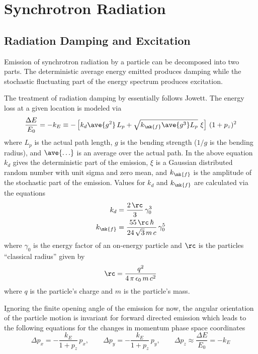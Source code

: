 \chapter{Synchrotron Radiation}

\section{Radiation Damping and Excitation}
\label{s:radiation}

Emission of synchrotron radiation by a particle can be decomposed into two parts. The deterministic
average energy emitted produces damping while the stochastic fluctuating part of the energy spectrum
produces excitation\cite{b:jowett}.

The treatment of radiation damping by \bmad essentially follows Jowett\cite{b:jowett}. The energy
loss at a given location is modeled via
\begin{equation}
  \frac{\Delta E}{E_0} = 
  -k_E \equiv -\left[ k_d \ave{g^2} \, L_p + \sqrt{k_\mk{f} \ave{g^3} L_p} \,\, \xi \right] \, (1 + p_z)^2
  \label{deekk}
\end{equation}
where $L_p$ is the actual path length, $g$ is the bending strength ($1/g$ is the bending radius),
and $\ave{\ldots}$ is an average over the actual path.  In the above equation $k_d$ gives the
deterministic part of the emission, $\xi$ is a Gaussian distributed random number with unit sigma
and zero mean, and $k_\mk{f}$ is the amplitude of the stochastic part of the emission. Values for $k_d$
and $k_\mk{f}$ are calculated via the equations
\begin{align}
  k_d &= \frac{2 \, \rc}{3} \, \gamma_0^3
    \label{k2r3g} \\
  k_\mk{f} &= \frac{55 \, \rc \, \hbar}{24 \, \sqrt{3} \, m \, c} \, \gamma_0^5
    \label{k55rh}
\end{align}
where $\gamma_0$ is the energy factor of an on-energy particle and $\rc$ is the particles
``classical radius'' given by
\begin{equation}
  \rc = \frac{q^2}{4 \, \pi \, \epsilon_0 \, m \, c^2} 
  \label{rq4pe}
\end{equation}
where $q$ is the particle's charge and $m$ is the particle's mass.

Ignoring the finite opening angle of the emission for now, the angular orientation of the particle
motion is invariant for forward directed emission which leads to the following equations for the
changes in momentum phase space coordinates
\begin{equation}
  \Delta p_x = -\frac{k_E}{1 + p_z} \, p_x , \qquad
  \Delta p_y = -\frac{k_E}{1 + p_z} \, p_y, \qquad
  \Delta p_z \approx \frac{\Delta E}{E_0} = -k_E 
  \label{pk1pp}
\end{equation}

